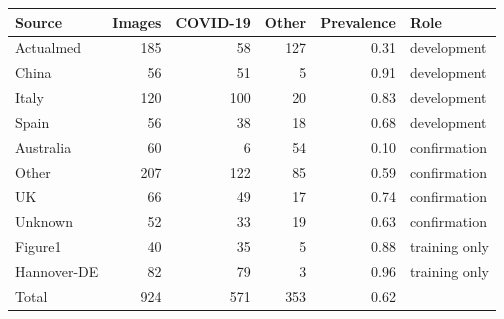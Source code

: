 \begin{tabular}{lrrrrl}
\toprule
Source & Images & COVID-19 & Other & Prevalence & Role\\
\midrule
Actualmed & 185 & 58 & 127 & 0.31 & development \\
China & 56 & 51 & 5 & 0.91 & development \\
Italy & 120 & 100 & 20 & 0.83 & development \\
Spain & 56 & 38 & 18 & 0.68 & development \\
Australia & 60 & 6 & 54 & 0.10 & confirmation \\
Other & 207 & 122 & 85 & 0.59 & confirmation \\
UK & 66 & 49 & 17 & 0.74 & confirmation \\
Unknown & 52 & 33 & 19 & 0.63 & confirmation \\
Figure1 & 40 & 35 & 5 & 0.88 & training only \\
Hannover-DE & 82 & 79 & 3 & 0.96 & training only \\
\midrule
Total & 924 & 571 & 353 & 0.62 & \\
\bottomrule
\end{tabular}